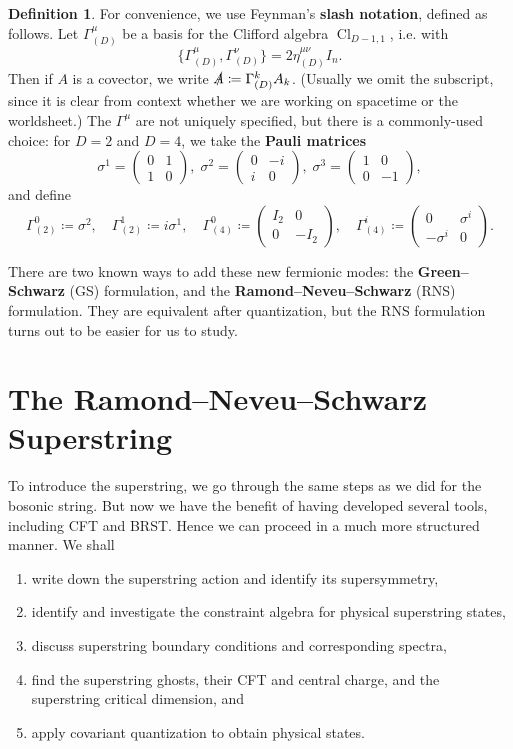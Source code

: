 \documentclass{report}
\theoremstyle{plain}
\theoremstyle{definition}
\newtheorem{definition}[theorem]{Definition}
\theoremstyle{remark}
\DeclareMathOperator{\Cl}{Cl}
\begin{document}
\begin{definition}
  For convenience, we use Feynman's {\bf slash notation}, defined as
  follows. Let $\Gamma^\mu_{(D)}$ be a basis for the Clifford algebra
  $\Cl_{D-1,1}$, i.e. with
  \[ \{\Gamma^\mu_{(D)}, \Gamma^\nu_{(D)}\} = 2\eta_{(D)}^{\mu\nu}I_n. \]
  Then if $A$ is a covector, we write $\slashed{A} \coloneqq
  \Gamma^k_{(D)} A_k$. (Usually we omit the subscript, since it is
  clear from context whether we are working on spacetime or the
  worldsheet.) The $\Gamma^\mu$ are not uniquely specified, but there
  is a commonly-used choice: for $D = 2$ and $D = 4$, we take the {\bf
    Pauli matrices}
  \[ \sigma^1 = \begin{pmatrix} 0 & 1 \\ 1 & 0 \end{pmatrix}, \; \sigma^2 = \begin{pmatrix} 0 & -i \\ i & 0 \end{pmatrix}, \; \sigma^3 = \begin{pmatrix} 1 & 0 \\ 0 & -1 \end{pmatrix}, \]
  and define
  \[ \Gamma^0_{(2)} \coloneqq \sigma^2, \quad \Gamma^1_{(2)} \coloneqq i\sigma^1, \quad \Gamma^0_{(4)} \coloneqq \begin{pmatrix} I_2 & 0 \\ 0 & -I_2 \end{pmatrix}, \quad \Gamma^i_{(4)} \coloneqq \begin{pmatrix} 0 & \sigma^i \\ -\sigma^i & 0 \end{pmatrix}. \]
\end{definition}

There are two known ways to add these new fermionic modes: the {\bf
  Green--Schwarz} (GS) formulation, and the {\bf
  Ramond--Neveu--Schwarz} (RNS) formulation. They are equivalent after
quantization, but the RNS formulation turns out to be easier for us to
study.

\section{The Ramond--Neveu--Schwarz Superstring}

To introduce the superstring, we go through the same steps as we did
for the bosonic string. But now we have the benefit of having
developed several tools, including CFT and BRST. Hence we can proceed
in a much more structured manner. We shall
\begin{enumerate}
\item write down the superstring action and identify its
  supersymmetry,
\item identify and investigate the constraint algebra for physical
  superstring states,
\item discuss superstring boundary conditions and corresponding
  spectra,
\item find the superstring ghosts, their CFT and central charge, and
  the superstring critical dimension, and
\item apply covariant quantization to obtain physical states.
\end{enumerate}
\end{document}
